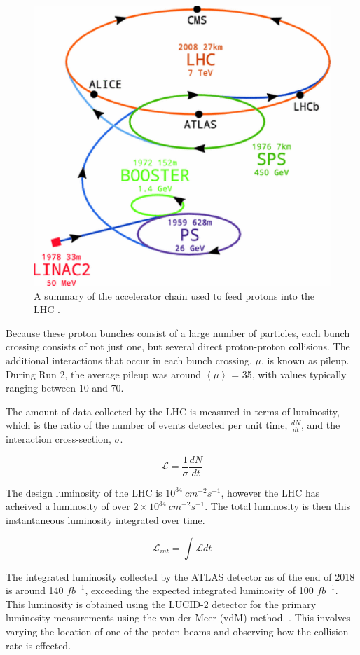 \begin{figure}[H]
\centering
   \includegraphics[width=0.7\linewidth]{figures/lhc/AccChain.eps}
\caption{A summary of the accelerator chain used to feed protons into the LHC \cite{accChainFig}.}
\label{fig:AccChain}
\end{figure}

Because these proton bunches consist of a large number of particles, each bunch crossing consists of not just one, but several direct proton-proton collisions. The additional interactions that occur in each bunch crossing, $\mu$, is known as pileup. During Run 2, the average pileup was around $\left\langle\mu\right\rangle$ = 35, with values typically ranging between 10 and 70.

The amount of data collected by the LHC is measured in terms of luminosity, which is the ratio of the number of events detected per unit time, $\frac{dN}{dt}$, and the interaction cross-section, $\sigma$. 

\begin{equation}                                                                                                                                
        \label{eq:lumiDef}                                                                                                                      
        \mathcal{L} = \frac{1}{\sigma}\frac{dN}{dt}
\end{equation}

The design luminosity of the LHC is $10^{34}\ cm^{-2}s^{-1}$, however the LHC has acheived a luminosity of over $2\times 10^{34}\ cm^{-2}s^{-1}$. The total luminosity is then this instantaneous luminosity integrated over time.

\begin{equation}
        \label{eq:intLumi}      
        \mathcal{L}_{int} = \int\mathcal{L}dt
\end{equation}

The integrated luminosity collected by the ATLAS detector as of the end of 2018 is around 140 $fb^{-1}$, exceeding the expected integrated luminosity of 100 $fb^{-1}$. This luminosity is obtained using the LUCID-2 detector \cite{LUCID2} for the primary luminosity measurements using the van der Meer (vdM) method. \cite{Balagura_2021}. This involves varying the location of one of the proton beams and observing how the collision rate is effected.
                                            
                                         
